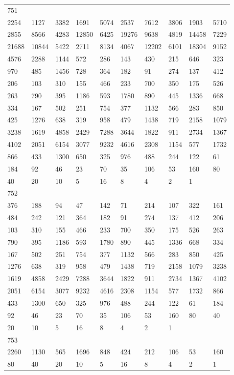 \begin{longtable}{*{10}{l}}
751&&&&&&&&&\\
2254& 1127& 3382& 1691& 5074& 2537& 7612& 3806& 1903& 5710\\
2855& 8566& 4283& 12850& 6425& 19276& 9638& 4819& 14458& 7229\\
21688& 10844& 5422& 2711& 8134& 4067& 12202& 6101& 18304& 9152\\
4576& 2288& 1144& 572& 286& 143& 430& 215& 646& 323\\
970& 485& 1456& 728& 364& 182& 91& 274& 137& 412\\
206& 103& 310& 155& 466& 233& 700& 350& 175& 526\\
263& 790& 395& 1186& 593& 1780& 890& 445& 1336& 668\\
334& 167& 502& 251& 754& 377& 1132& 566& 283& 850\\
425& 1276& 638& 319& 958& 479& 1438& 719& 2158& 1079\\
3238& 1619& 4858& 2429& 7288& 3644& 1822& 911& 2734& 1367\\
4102& 2051& 6154& 3077& 9232& 4616& 2308& 1154& 577& 1732\\
866& 433& 1300& 650& 325& 976& 488& 244& 122& 61\\
184& 92& 46& 23& 70& 35& 106& 53& 160& 80\\
40& 20& 10& 5& 16& 8& 4& 2& 1& \\

752&&&&&&&&&\\
376& 188& 94& 47& 142& 71& 214& 107& 322& 161\\
484& 242& 121& 364& 182& 91& 274& 137& 412& 206\\
103& 310& 155& 466& 233& 700& 350& 175& 526& 263\\
790& 395& 1186& 593& 1780& 890& 445& 1336& 668& 334\\
167& 502& 251& 754& 377& 1132& 566& 283& 850& 425\\
1276& 638& 319& 958& 479& 1438& 719& 2158& 1079& 3238\\
1619& 4858& 2429& 7288& 3644& 1822& 911& 2734& 1367& 4102\\
2051& 6154& 3077& 9232& 4616& 2308& 1154& 577& 1732& 866\\
433& 1300& 650& 325& 976& 488& 244& 122& 61& 184\\
92& 46& 23& 70& 35& 106& 53& 160& 80& 40\\
20& 10& 5& 16& 8& 4& 2& 1& \\

753&&&&&&&&&\\
2260& 1130& 565& 1696& 848& 424& 212& 106& 53& 160\\
80& 40& 20& 10& 5& 16& 8& 4& 2& 1\\


\end{longtable}

